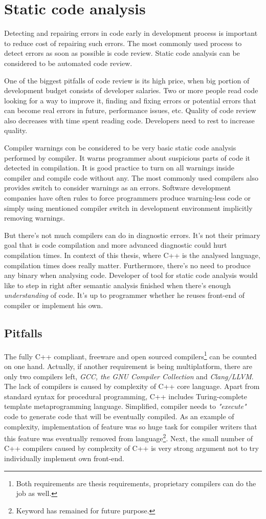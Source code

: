 \chapter{Static code analysis}
Detecting and repairing errors in code early in development process is important to reduce cost of repairing such errors. The most commonly used process to detect errors as soon as possible is code review. Static code analysis can be considered to be automated code review.

One of the biggest pitfalls of code review is its high price, when big portion of development budget consists of developer salaries. Two or more people read code looking for a way to improve it, finding and fixing errors or potential errors that can become real errors in future, performance issues, etc. Quality of code review also decreases with time spent reading code. Developers need to rest to increase quality.

Compiler warnings con be considered to be very basic static code analysis performed by compiler. It warns programmer about suspicious parts of code it detected in compilation. It is good practice to turn on all warnings inside compiler and compile code without any. The most commonly used compilers also provides switch to consider warnings as an errors. Software development companies have often rules to force programmers produce warning-less code or simply using mentioned compiler switch in development environment implicitly removing warnings.

But there's not much compilers can do in diagnostic errors. It's not their primary goal that is code compilation and more advanced diagnostic could hurt compilation times. In context of this thesis, where C++  is the analysed language, compilation times does really matter. Furthermore, there's no need to produce any binary when analysing code. Developer of tool for static code analysis would like to step in right after semantic analysis finished when there's enough \textit{understanding} of code. It's up to programmer whether he reuses front-end of compiler or implement his own.

\section{Pitfalls}
The fully C++ compliant, freeware and open sourced compilers\footnote{Both requirements are thesis requirements, proprietary compilers can do the job as well.} can be counted on one hand. Actually, if another requirement is being multiplatform, there are only two compilers left, \emph{GCC, the GNU Compiler Collection} and \emph{Clang/LLVM}. The lack of compilers is caused by complexity of C++ core language. Apart from standard syntax for procedural programming, C++ includes Turing-complete template metaprogramming language. Simplified, compiler needs to \textit{"execute"} code to generate code that will be eventually compiled. As an example of complexity, implementation of  feature was so huge task for compiler writers that this feature was eventually removed from language\footnote{Keyword has remained for future purpose.}. Next, the small number of C++ compilers caused by complexity of C++ is very strong argument not to try individually  implement own front-end.

